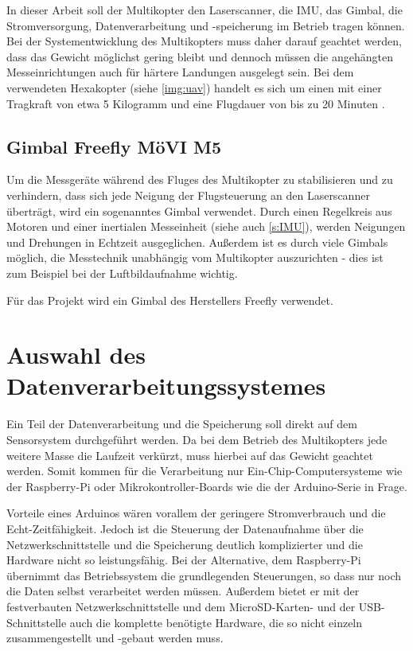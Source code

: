 \documentclass[a4paper,12pt,bibliography=totoc, listof=totoc,titlepage,pointlessnumbers]{scrreprt}
\begin{document}
In dieser Arbeit soll der Multikopter den Laserscanner, die IMU, das Gimbal, die Stromversorgung, Datenverarbeitung und -speicherung im Betrieb tragen können. Bei der Systementwicklung des Multikopters muss daher darauf geachtet werden, dass das Gewicht möglichst gering bleibt und dennoch müssen die angehängten Messeinrichtungen auch für härtere Landungen ausgelegt sein. Bei dem  verwendeten Hexakopter (siehe \autoref{img:uav}) handelt es sich um einen  mit einer Tragkraft von etwa 5 Kilogramm und eine Flugdauer von bis zu 20 Minuten \citep{Schulz}.

\subsection{Gimbal Freefly MöVI M5}
Um die Messgeräte während des Fluges des Multikopter zu stabilisieren und zu verhindern, dass sich jede Neigung der Flugsteuerung an den Laserscanner überträgt, wird ein sogenanntes Gimbal verwendet. Durch einen Regelkreis aus Motoren und einer inertialen Messeinheit (siehe auch \autoref{s:IMU}), werden Neigungen und Drehungen in Echtzeit ausgeglichen. Außerdem ist es durch viele Gimbals möglich, die Messtechnik unabhängig vom Multikopter auszurichten - dies ist zum Beispiel bei der Luftbildaufnahme wichtig.

Für das Projekt wird ein Gimbal des Herstellers Freefly verwendet. 


\section{Auswahl des Datenverarbeitungssystemes}

Ein Teil der Datenverarbeitung und die Speicherung soll direkt auf dem Sensorsystem durchgeführt werden. Da bei dem Betrieb des Multikopters jede weitere Masse die Laufzeit verkürzt, muss hierbei auf das Gewicht geachtet werden. Somit kommen für die Verarbeitung nur Ein-Chip-Computersysteme wie der Raspberry-Pi oder Mikrokontroller-Boards wie die der Arduino-Serie in Frage. 

Vorteile eines Arduinos wären vorallem der geringere Stromverbrauch und die Echt-Zeitfähigkeit. Jedoch ist die Steuerung der Datenaufnahme über die Netzwerkschnittstelle und die Speicherung deutlich komplizierter und die Hardware nicht so leistungsfähig. Bei der Alternative, dem Raspberry-Pi übernimmt das Betriebssystem die grundlegenden Steuerungen, so dass nur noch die Daten selbst verarbeitet werden müssen. Außerdem bietet er mit der festverbauten Netzwerkschnittstelle und dem MicroSD-Karten- und der USB-Schnittstelle auch die komplette benötigte Hardware, die so nicht einzeln zusammengestellt und -gebaut werden muss.
\end{document}
